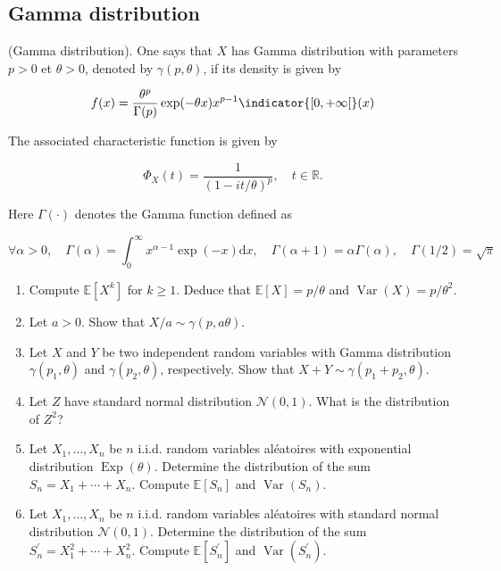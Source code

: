 \begin{center}
  \section*{Gamma distribution}
\end{center}

\begin{Exercise}
  (Gamma distribution). One says that $X$ has Gamma distribution with parameters $p>0$ et $\theta>0$, denoted by $\gamma(p, \theta)$, if its density is given by

  \[
    f(x)=\frac{\theta^{p}}{\Gamma(p)} \exp (-\theta x) x^{p-1} \indicator{ [0,+\infty[ }(x)
  \]

  The associated characteristic function is given by

  \[
    \Phi_{X}(t)=\frac{1}{(1-i t / \theta)^{p}}, \quad t \in \mathbb{R} .
  \]

  Here $\Gamma(\cdot)$ denotes the Gamma function defined as

  \[
    \forall \alpha>0, \quad \Gamma(\alpha)=\int_{0}^{\infty} x^{\alpha-1} \exp (-x) \mathrm{d} x, \quad \Gamma(\alpha+1)=\alpha \Gamma(\alpha), \quad \Gamma(1 / 2)=\sqrt{\pi}
  \]

  \begin{enumerate}
    \item Compute $\mathbb{E}\left[X^{k}\right]$ for $k \geq 1$. Deduce that
          $\mathbb{E}[X]=p / \theta$ and $\operatorname{Var}(X)=p / \theta^{2}$.
    \item Let $a>0$. Show that $X / a \sim \gamma(p, a \theta)$.
    \item Let $X$ and $Y$ be two independent random variables with Gamma distribution
          $\gamma\left(p_{1}, \theta\right)$ and $\gamma\left(p_{2}, \theta\right)$,
          respectively. Show that $X+Y \sim \gamma\left(p_{1}+p_{2}, \theta\right)$.

    \item Let $Z$ have standard normal distribution $\mathcal{N}(0,1)$. What is the
          distribution of $Z^{2}$?

    \item Let $X_{1}, \ldots, X_{n}$ be $n$ i.i.d. random variables aléatoires with
          exponential distribution $\operatorname{Exp}(\theta)$. Determine the
          distribution of the sum $S_{n}=X_{1}+\cdots+X_{n}$. Compute
          $\mathbb{E}\left[S_{n}\right]$ and $\operatorname{Var}\left(S_{n}\right)$.

    \item Let $X_{1}, \ldots, X_{n}$ be $n$ i.i.d. random variables aléatoires with
          standard normal distribution $\mathcal{N}(0,1)$. Determine the distribution of
          the sum $S_{n}^{\prime}=X_{1}^{2}+\cdots+X_{n}^{2}$. Compute
          $\mathbb{E}\left[S_{n}^{\prime}\right]$ and
          $\operatorname{Var}\left(S_{n}^{\prime}\right)$.
  \end{enumerate}
\end{Exercise}

